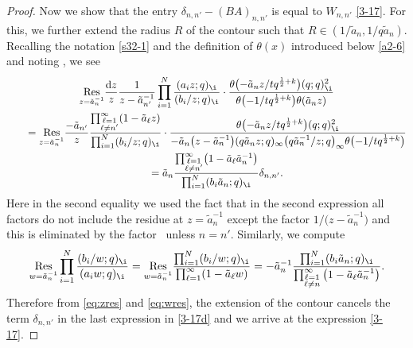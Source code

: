 \begin{proof}
 Now we show that the entry $\delta_{n,n'}-(BA)_{n,n'}$ is equal to $W_{n,n'}$ \eqref{3-17}. For this, we further extend the radius $R$ of the contour such that $R\in(1/\tilde{a}_n,1/q\tilde{a}_n)$. Recalling the notation \eqref{s32-1} and the definition of $\theta (x)$ introduced below \eqref{a2-6} and
 noting ,
 we see
 \begin{gather}
 \underset{z=\tilde{a}_{n}^{-1}}{\text{Res}}
 \frac{{\rm d}z}{z}
 \frac{1}{z-\tilde{a}_{n'}^{-1}}
 \prod_{i=1}^N\frac{(a_i z;q)_{\i}}{(b_i/z;q)_{\i}}
 \cdot
 \frac{\theta\bigl(-\tilde{a}_{n}z/tq^{\frac12+k}\bigr)(q;q)_{\i}^2}{\theta\bigl(-1/tq^{\frac12+k}\bigr)\theta(\tilde{a}_n z)}\nonumber \\
 \qquad=\underset{z=\tilde{a}_{n}^{-1}}{\text{Res}}
 \frac{-\tilde{a}_{n'}}{z}
 \frac{\prod_{\substack{\ell=1\\ \ell\neq n'}}^{\infty}(1-\tilde{a}_\ell z)}{\prod_{i=1}^N(b_i/z;q)_{\i}}
 \cdot
 \frac{\theta\bigl(-\tilde{a}_{n}z/tq^{\frac12+k}\bigr)(q;q)_{\i}^2}{-\tilde{a}_n\bigl(z-\tilde{a}_n^{-1}\bigr)(q\tilde{a}_nz;q)_\infty \bigl(q\tilde{a}_n^{-1}/z;q\bigr)_\infty\theta\bigl(-1/tq^{\frac12+k}\bigr)}
 \nonumber\\
 \qquad = \tilde{a}_n
 \frac{\prod_{\substack{\ell=1\\ \ell\neq n'}}^{\infty}\bigl(1-\tilde{a}_\ell \tilde{a}_n^{-1}\bigr)}{\prod_{i=1}^N(b_i \tilde{a}_n;q)_{\i}}\delta_{n,n'}. \label{eq:zres}
 \end{gather}
 Here in the second equality we used the fact that in the second expression all factors do not include the residue at $z=\tilde{a}_n^{-1}$ except the factor $1/\big(z-\tilde{a}_n^{-1}\big)$ and this is eliminated by the factor~ unless $n=n'$.
 Similarly, we compute
 \begin{align}\label{eq:wres}
 \underset{w=\tilde{a}_{n}^{-1}}{\text{Res}}
 \prod_{i=1}^N\frac{(b_i/w;q)_{\i}}{(a_i w;q)_{\i}}=\underset{w=\tilde{a}_{n}^{-1}}{\text{Res}}\frac{\prod_{i=1}^N(b_i/w;q)_{\i}}{\prod_{\ell=1}^{\infty}(1-\tilde{a}_{\ell}w)}=-\tilde{a}_n^{-1}
 \frac{\prod_{i=1}^N(b_i \tilde{a}_n;q)_{\i}}{\prod_{\substack{\ell=1\\ \ell\neq n}}^{\infty}\big(1-\tilde{a}_\ell \tilde{a}_n^{-1}\big)}.
 \end{align}
 Therefore from \eqref{eq:zres} and \eqref{eq:wres}, the extension of the contour cancels the term $\delta_{n,n'}$ in the last expression in \eqref{3-17d} and we arrive at the expression \eqref{3-17}.
 \end{proof}


